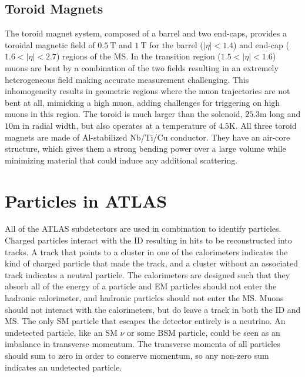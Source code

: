 \subsection{Toroid Magnets}

The toroid magnet system, composed of a barrel and two end-caps, provides a toroidal magnetic field of $0.5~\textrm{T}$ and $1~\textrm{T}$ for the barrel ($|\eta| < 1.4$) and end-cap ($1.6 <|\eta| < 2.7$) regions of the \ac{MS}. In the transition region ($1.5 < |\eta| < 1.6$) muons are bent by a combination of the two fields resulting in an extremely heterogeneous field making accurate measurement challenging. This inhomogeneity results in geometric regions where the muon trajectories are not bent at all, mimicking a high \pt muon, adding challenges for triggering on high \pt muons in this region. The toroid is much larger than the solenoid, $25.3 \textrm{m}$ long and $10 \textrm{m}$ in radial width, but also operates at a temperature of $4.5 \textrm{K}$. All three toroid magnets are made of Al-stabilized Nb/Ti/Cu conductor. They have an air-core structure, which gives them a strong bending power over a large volume while minimizing material that could induce any additional scattering. 


\section{Particles in ATLAS}
All of the \ac{ATLAS} subdetectors are used in combination to identify particles. Charged particles interact with the \ac{ID} resulting in hits to be reconstructed into tracks. A track that points to a cluster in one of the calorimeters indicates the kind of charged particle that made the track, and a cluster without an associated track indicates a neutral particle. The calorimeters are designed such that they absorb all of the energy of a particle and \ac{EM} particles should not enter the hadronic calorimeter, and hadronic particles should not enter the \ac{MS}. Muons should not interact with the calorimeters, but do leave a track in both the \ac{ID} and \ac{MS}. The only \ac{SM} particle that escapes the detector entirely is a neutrino. An undetected particle, like an \ac{SM} $\nu$ or some \ac{BSM} particle, could be seen as an imbalance in transverse momentum. The transverse momenta of all particles should sum to zero in order to conserve momentum, so any non-zero sum indicates an undetected particle.


